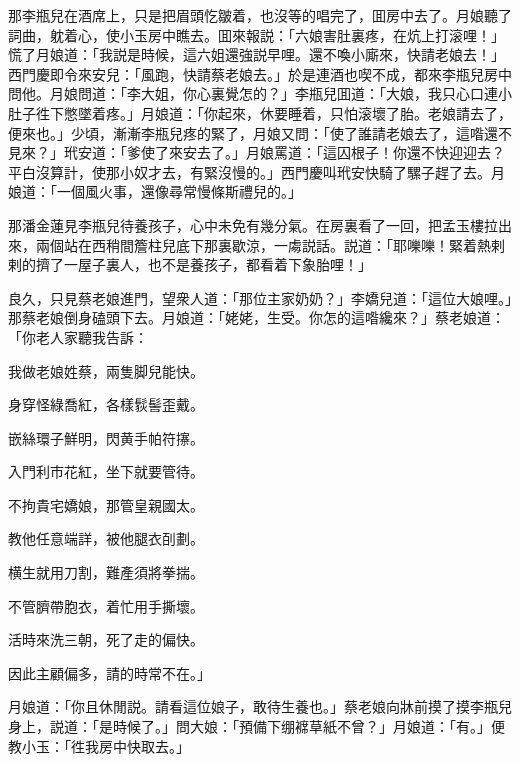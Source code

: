 那李瓶兒在酒席上，只是把眉頭忔皺着，也沒等的唱完了，囬房中去了。月娘聽了詞曲，躭着心，使小玉房中瞧去。囬來報説：「六娘害肚裏疼，在炕上打滚哩！」慌了月娘道：「我説是時候，這六姐還強説早哩。還不喚小廝來，快請老娘去！」西門慶即令來安兒：「風跑，快請蔡老娘去。」於是連酒也喫不成，都來李瓶兒房中問他。月娘問道：「李大姐，你心裏覺怎的？」李瓶兒囬道：「大娘，我只心口連小肚子徃下憋墜着疼。」月娘道：「你起來，休要睡着，只怕滚壞了胎。老娘請去了，便來也。」少頃，漸漸李瓶兒疼的緊了，月娘又問：「使了誰請老娘去了，這喒還不見來？」玳安道：「爹使了來安去了。」月娘罵道：「這囚根子！你還不快迎迎去？平白沒算計，使那小奴才去，有緊沒慢的。」西門慶叫玳安快騎了騾子趕了去。月娘道：「一個風火事，還像尋常慢條斯禮兒的。」

那潘金蓮見李瓶兒待養孩子，心中未免有幾分氣。在房裏看了一回，把孟玉樓拉出來，兩個站在西稍間簷柱兒底下那裏歇涼，一䖏説話。説道：「耶嚛嚛！緊着熱剌剌的擠了一屋子裏人，也不是養孩子，都看着下象胎哩！」

良久，只見蔡老娘進門，望衆人道：「那位主家奶奶？」李嬌兒道：「這位大娘哩。」那蔡老娘倒身磕頭下去。月娘道：「姥姥，生受。你怎的這喒纔來？」蔡老娘道：「你老人家聽我告訴：

\begin{myquote}
我做老娘姓蔡，兩隻脚兒能快。

身穿怪綠喬紅，各樣䯼髻歪戴。

嵌絲環子鮮明，閃黄手帕符㩟。

入門利市花紅，坐下就要管待。

不拘貴宅嬌娘，那管皇親國太。

教他任意端詳，被他腿衣㓦劃。

横生就用刀割，難產須將拳揣。

不管臍帶胞衣，着忙用手撕壞。

活時來洗三朝，死了走的偏快。

因此主顧偏多，請的時常不在。」
\end{myquote}

月娘道：「你且休閒説。請看這位娘子，敢待生養也。」蔡老娘向牀前摸了摸李瓶兒身上，説道：「是時候了。」問大娘：「預備下绷褯草紙不曾？」月娘道：「有。」便教小玉：「徃我房中快取去。」

